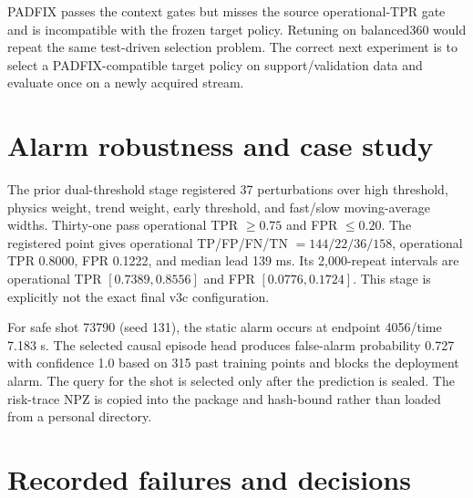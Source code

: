 \documentclass[10pt]{article}
\begin{document}
PADFIX passes the context gates but misses the source operational-TPR gate and is incompatible with the frozen target policy.  Retuning on balanced360 would repeat the same test-driven selection problem.  The correct next experiment is to select a PADFIX-compatible target policy on support/validation data and evaluate once on a newly acquired stream.

\section{Alarm robustness and case study}

The prior dual-threshold stage registered 37 perturbations over high threshold, physics weight, trend weight, early threshold, and fast/slow moving-average widths.  Thirty-one pass operational TPR $\geq0.75$ and FPR $\leq0.20$.  The registered point gives operational TP/FP/FN/TN $=144/22/36/158$, operational TPR 0.8000, FPR 0.1222, and median lead 139 ms.  Its 2,000-repeat intervals are operational TPR $[0.7389,0.8556]$ and FPR $[0.0776,0.1724]$.  This stage is explicitly not the exact final v3c configuration.

For safe shot 73790 (seed 131), the static alarm occurs at endpoint 4056/time 7.183 s.  The selected causal episode head produces false-alarm probability 0.727 with confidence 1.0 based on 315 past training points and blocks the deployment alarm.  The query for the shot is selected only after the prediction is sealed.  The risk-trace NPZ is copied into the package and hash-bound rather than loaded from a personal directory.

\section{Recorded failures and decisions}
\end{document}
